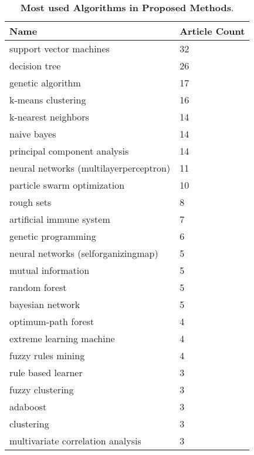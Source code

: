 
\begin{table}[!ht]
\centering 
    \caption{ \textbf{Most used Algorithms in Proposed Methods}. }
    \label{table-metaAlgorithms}

\begin{tabular}{@{}p{}p{}@{}}

\toprule

\textbf{Name} & \textbf{Article Count} \\

\midrule

support vector machines & 32 \\ 
decision tree & 26 \\ 
genetic algorithm & 17 \\ 
k-means clustering & 16 \\ 
k-nearest neighbors & 14 \\ 
naive bayes & 14 \\ 
principal component analysis & 14 \\ 
neural networks (multilayerperceptron) & 11 \\ 
particle swarm optimization & 10 \\ 
rough sets & 8 \\ 
artificial immune system & 7 \\ 
genetic programming & 6 \\ 
neural networks (selforganizingmap) & 5 \\ 
mutual information & 5 \\ 
random forest & 5 \\ 
bayesian network & 5 \\ 
optimum-path forest & 4 \\ 
extreme learning machine & 4 \\ 
fuzzy rules mining & 4 \\ 
rule based learner & 3 \\ 
fuzzy clustering & 3 \\ 
adaboost & 3 \\ 
clustering & 3 \\ 
multivariate correlation analysis & 3 \\ 

\bottomrule

\end{tabular}

\end{table}

